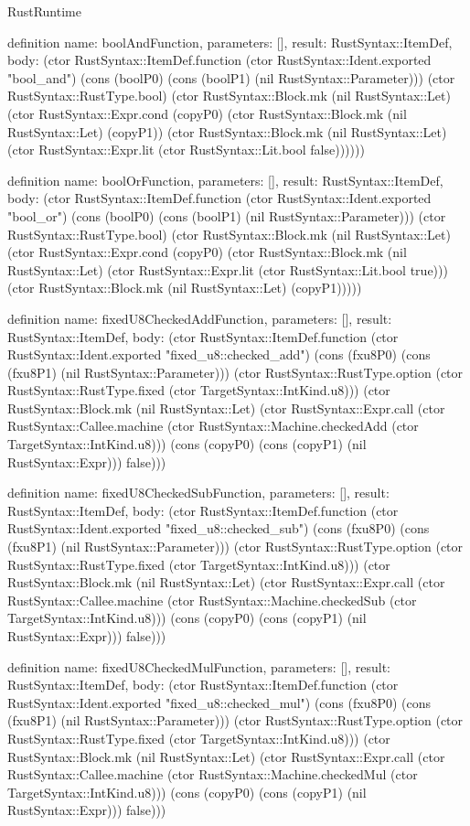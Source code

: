 \begin{lexlean}{RustRuntime}
\begin{semanticmodule}
definition{
  name: boolAndFunction,
  parameters: [],
  result: RustSyntax::ItemDef,
  body: (ctor RustSyntax::ItemDef.function (ctor RustSyntax::Ident.exported "bool_and") (cons (boolP0) (cons (boolP1) (nil RustSyntax::Parameter))) (ctor RustSyntax::RustType.bool) (ctor RustSyntax::Block.mk (nil RustSyntax::Let) (ctor RustSyntax::Expr.cond (copyP0) (ctor RustSyntax::Block.mk (nil RustSyntax::Let) (copyP1)) (ctor RustSyntax::Block.mk (nil RustSyntax::Let) (ctor RustSyntax::Expr.lit (ctor RustSyntax::Lit.bool false))))))
}

definition{
  name: boolOrFunction,
  parameters: [],
  result: RustSyntax::ItemDef,
  body: (ctor RustSyntax::ItemDef.function (ctor RustSyntax::Ident.exported "bool_or") (cons (boolP0) (cons (boolP1) (nil RustSyntax::Parameter))) (ctor RustSyntax::RustType.bool) (ctor RustSyntax::Block.mk (nil RustSyntax::Let) (ctor RustSyntax::Expr.cond (copyP0) (ctor RustSyntax::Block.mk (nil RustSyntax::Let) (ctor RustSyntax::Expr.lit (ctor RustSyntax::Lit.bool true))) (ctor RustSyntax::Block.mk (nil RustSyntax::Let) (copyP1)))))
}

definition{
  name: fixedU8CheckedAddFunction,
  parameters: [],
  result: RustSyntax::ItemDef,
  body: (ctor RustSyntax::ItemDef.function (ctor RustSyntax::Ident.exported "fixed_u8::checked_add") (cons (fxu8P0) (cons (fxu8P1) (nil RustSyntax::Parameter))) (ctor RustSyntax::RustType.option (ctor RustSyntax::RustType.fixed (ctor TargetSyntax::IntKind.u8))) (ctor RustSyntax::Block.mk (nil RustSyntax::Let) (ctor RustSyntax::Expr.call (ctor RustSyntax::Callee.machine (ctor RustSyntax::Machine.checkedAdd (ctor TargetSyntax::IntKind.u8))) (cons (copyP0) (cons (copyP1) (nil RustSyntax::Expr))) false)))
}

definition{
  name: fixedU8CheckedSubFunction,
  parameters: [],
  result: RustSyntax::ItemDef,
  body: (ctor RustSyntax::ItemDef.function (ctor RustSyntax::Ident.exported "fixed_u8::checked_sub") (cons (fxu8P0) (cons (fxu8P1) (nil RustSyntax::Parameter))) (ctor RustSyntax::RustType.option (ctor RustSyntax::RustType.fixed (ctor TargetSyntax::IntKind.u8))) (ctor RustSyntax::Block.mk (nil RustSyntax::Let) (ctor RustSyntax::Expr.call (ctor RustSyntax::Callee.machine (ctor RustSyntax::Machine.checkedSub (ctor TargetSyntax::IntKind.u8))) (cons (copyP0) (cons (copyP1) (nil RustSyntax::Expr))) false)))
}

definition{
  name: fixedU8CheckedMulFunction,
  parameters: [],
  result: RustSyntax::ItemDef,
  body: (ctor RustSyntax::ItemDef.function (ctor RustSyntax::Ident.exported "fixed_u8::checked_mul") (cons (fxu8P0) (cons (fxu8P1) (nil RustSyntax::Parameter))) (ctor RustSyntax::RustType.option (ctor RustSyntax::RustType.fixed (ctor TargetSyntax::IntKind.u8))) (ctor RustSyntax::Block.mk (nil RustSyntax::Let) (ctor RustSyntax::Expr.call (ctor RustSyntax::Callee.machine (ctor RustSyntax::Machine.checkedMul (ctor TargetSyntax::IntKind.u8))) (cons (copyP0) (cons (copyP1) (nil RustSyntax::Expr))) false)))
}


\end{semanticmodule}
\end{lexlean}
